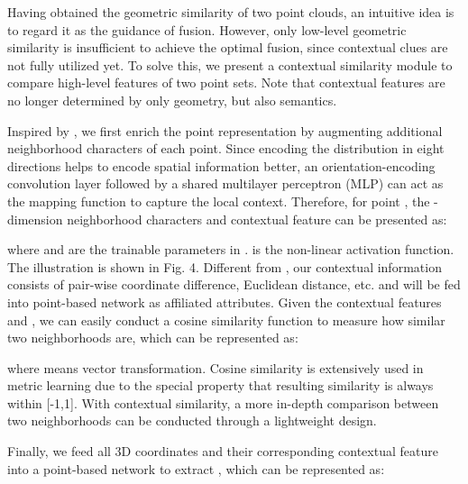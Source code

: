 \documentclass[letterpaper, 10 pt, conference]{ieeeconf}
\begin{document}
Having obtained the geometric similarity of two point clouds, an intuitive idea is to regard it as the guidance of fusion. However, only low-level geometric similarity is insufficient to achieve the optimal fusion, since contextual clues are not fully utilized yet. 
To solve this, we present a contextual similarity module to compare high-level features of two point sets. Note that contextual features are no longer determined by only geometry, but also semantics.


Inspired by \cite{NIPS2019_8706}, we first enrich the point representation by augmenting additional neighborhood characters of each point.
Since encoding the distribution in eight directions \cite{jiang2018pointsift} helps to encode spatial information better, an orientation-encoding convolution layer followed by a shared multilayer perceptron (MLP) can act as the mapping function  to capture the local context. Therefore, for point , the -dimension neighborhood characters  and contextual feature  can be presented as:



where  and  are the trainable parameters in .  is the non-linear activation function. The illustration is shown in Fig. 4. Different from \cite{NIPS2019_8706}, our contextual information consists of pair-wise coordinate difference, Euclidean distance, etc. and will be fed into point-based network as affiliated attributes.
Given the contextual features  and , we can easily conduct a cosine similarity function to measure how similar two neighborhoods are, which can be represented as:

where  means vector transformation. Cosine similarity is extensively used in metric learning \cite{nguyen2010cosine,wojke2018deep} due to the special property that resulting similarity is always within [-1,1]. With contextual similarity,  a more in-depth comparison between two neighborhoods can be conducted through a lightweight design.

Finally, we feed all 3D coordinates  and their corresponding contextual feature  into a point-based network to extract , which can be represented as:
\end{document}
